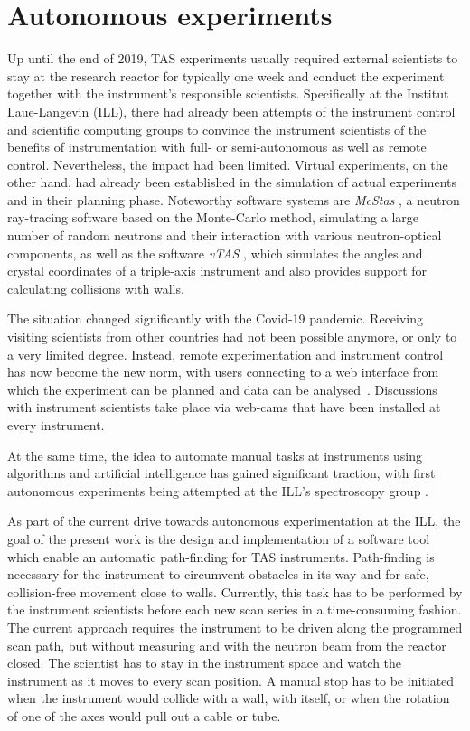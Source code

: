 \section{Autonomous experiments \label{sec:autonomous}}

Up until the end of 2019, TAS experiments usually required external scientists to stay at the research reactor for
typically one week and conduct the experiment together with the instrument's responsible scientists. Specifically
at the Institut Laue-Langevin (ILL), there had already been attempts \cite{Song2020} of the instrument control
and scientific computing groups to convince the instrument scientists of the benefits of instrumentation with full- or
semi-autonomous as well as remote control. Nevertheless, the impact had been limited.
Virtual experiments, on the other hand, had already been established in the simulation of actual experiments and in their
planning phase. Noteworthy software systems are \textit{McStas} \cite{McStas2020, McStas2021}, a neutron ray-tracing software based on the
Monte-Carlo method, simulating a large number of random neutrons and their interaction with various neutron-optical components,
as well as the software \textit{vTAS} \cite{vTAS2013}, which simulates the angles and crystal coordinates of a triple-axis
instrument and also provides support for calculating collisions with walls.

The situation changed significantly with the Covid-19 pandemic. Receiving visiting scientists from other countries had
not been possible anymore, or only to a very limited degree. Instead, remote experimentation and instrument control has
now become the new norm, with users connecting to a web interface from which the experiment can be planned and data can
be analysed~\cite{web_ill_visa}.
Discussions with instrument scientists take place via web-cams that have been installed at every instrument.

At the same time, the idea to automate manual tasks at instruments using algorithms and artificial intelligence has
gained significant traction, with first autonomous experiments being attempted at the ILL's spectroscopy group
\cite{web_ill_autonomous2020, Noack2021}.

As part of the current drive towards autonomous experimentation at the ILL, the goal of the present work is the design
and implementation of a software tool which enable an automatic path-finding for TAS instruments. Path-finding
is necessary for the instrument to circumvent obstacles in its way and for safe, collision-free movement close to walls.
Currently, this task has to be performed by the instrument scientists before each new scan series in a time-consuming fashion.
The current approach requires the instrument to be driven along the programmed scan path, but without measuring and with
the neutron beam from the reactor closed.
The scientist has to stay in the instrument space and watch the instrument as it moves to every scan position.
A manual stop has to be initiated when the instrument would collide with a wall, with itself, or when the rotation of one
of the axes would pull out a cable or tube.



